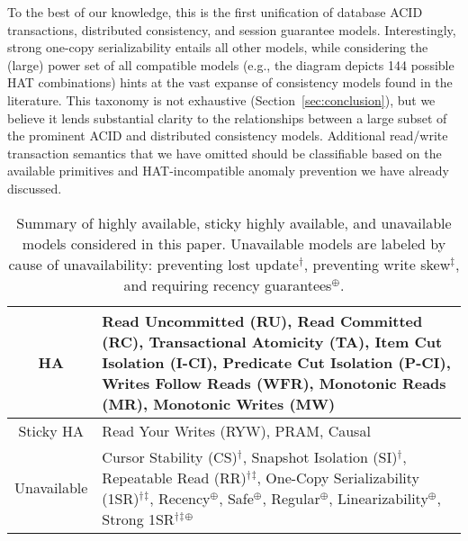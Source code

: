 To the best of our knowledge, this is the first unification of
database ACID transactions, distributed consistency, and session
guarantee models. Interestingly, strong one-copy serializability
entails all other models, while considering the (large) power set of
all compatible models (e.g., the diagram depicts 144 possible HAT
combinations) hints at the vast expanse of consistency models found in
the literature. This taxonomy is not exhaustive
(Section~\ref{sec:conclusion}), but we believe it lends substantial
clarity to the relationships between a large subset of the prominent
ACID and distributed consistency models. Additional read/write
transaction semantics that we have omitted should be classifiable
based on the available primitives and HAT-incompatible anomaly
prevention we have already discussed.

 \newcommand{\lostupdate}{$^\dagger$}
 \newcommand{\rwskew}{$^\ddagger$}
 \newcommand{\linearizable}{$^\oplus$}

\begin{table}[t!]
\begin{tabular}{| c | p{6cm} | }\hline
HA & Read Uncommitted (RU), Read Committed (RC), Transactional
Atomicity (TA), Item Cut Isolation (I-CI), Predicate Cut Isolation
(P-CI), Writes Follow Reads (WFR), Monotonic Reads (MR), Monotonic
Writes (MW)\\\hline Sticky HA & Read Your Writes (RYW), PRAM,
Causal\\\hline Unavailable & Cursor Stability (CS)\lostupdate,
Snapshot Isolation (SI)\lostupdate, Repeatable Read
(RR)\lostupdate\rwskew, One-Copy Serializability
(1SR)\lostupdate\rwskew, Recency\linearizable, Safe\linearizable,
Regular\linearizable, Linearizability\linearizable, Strong
1SR\lostupdate\rwskew\linearizable \\\hline
\end{tabular}
\caption{Summary of highly available, sticky highly available, and
  unavailable models considered in this paper. Unavailable models are
  labeled by cause of unavailability: preventing lost
  update\lostupdate, preventing write skew\rwskew, and requiring
  recency guarantees\linearizable.}
\label{table:hatcompared}
\end{table}


